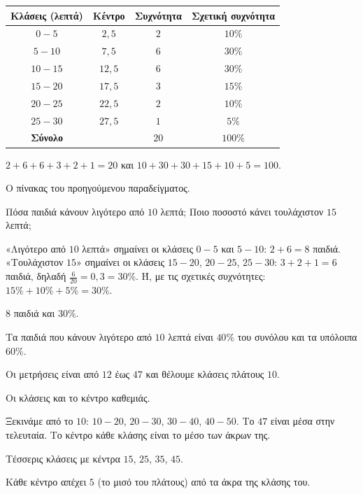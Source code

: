 \begin{center}
\renewcommand{\arraystretch}{1.25}
\begin{tabular}{cccc}
\toprule
\textbf{Κλάσεις (λεπτά)} & \textbf{Κέντρο} & \textbf{Συχνότητα} & \textbf{Σχετική συχνότητα}\\
\midrule
$0-5$ & $2{,}5$ & $2$ & $10\%$\\
$5-10$ & $7{,}5$ & $6$ & $30\%$\\
$10-15$ & $12{,}5$ & $6$ & $30\%$\\
$15-20$ & $17{,}5$ & $3$ & $15\%$\\
$20-25$ & $22{,}5$ & $2$ & $10\%$\\
$25-30$ & $27{,}5$ & $1$ & $5\%$\\
\midrule
\textbf{Σύνολο} & & $20$ & $100\%$\\
\bottomrule
\end{tabular}
\end{center}

\elegxos $2+6+6+3+2+1=20$ και $10+30+30+15+10+5=100$.

\tixero Ο πίνακας του προηγούμενου παραδείγματος.\par
\tithelo Πόσα παιδιά κάνουν λιγότερο από $10$ λεπτά; Ποιο ποσοστό κάνει τουλάχιστον $15$ λεπτά;\par
\possindeo «Λιγότερο από $10$ λεπτά» σημαίνει οι κλάσεις $0-5$ και $5-10$: $2+6=8$ παιδιά. «Τουλάχιστον $15$» σημαίνει οι κλάσεις $15-20$, $20-25$, $25-30$: $3+2+1=6$ παιδιά, δηλαδή $\frac{6}{20}=0{,}3=30\%$. Ή, με τις σχετικές συχνότητες: $15\%+10\%+5\%=30\%$.\par
\apantisi $8$ παιδιά και $30\%$.\par
\elegxos Τα παιδιά που κάνουν λιγότερο από $10$ λεπτά είναι $40\%$ του συνόλου και τα υπόλοιπα $60\%$.

\tixero Οι μετρήσεις είναι από $12$ έως $47$ και θέλουμε κλάσεις πλάτους $10$.\par
\tithelo Οι κλάσεις και το κέντρο καθεμιάς.\par
\possindeo Ξεκινάμε από το $10$: $10-20$, $20-30$, $30-40$, $40-50$. Το $47$ είναι μέσα στην τελευταία. Το κέντρο κάθε κλάσης είναι το μέσο των άκρων της.\par
\apantisi Τέσσερις κλάσεις με κέντρα $15$, $25$, $35$, $45$.\par
\elegxos Κάθε κέντρο απέχει $5$ (το μισό του πλάτους) από τα άκρα της κλάσης του.


